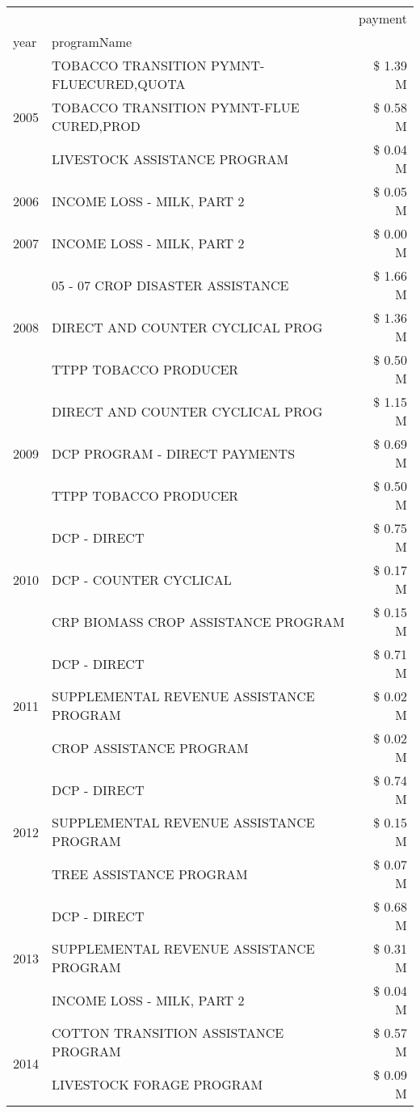 \begin{tabular}{llr}
\toprule
 &  & payment \\
year & programName &  \\
\midrule
\multirow[t]{3}{*}{2005} & TOBACCO TRANSITION PYMNT-FLUECURED,QUOTA & \$ 1.39 M \\
 & TOBACCO TRANSITION PYMNT-FLUE CURED,PROD & \$ 0.58 M \\
 & LIVESTOCK ASSISTANCE PROGRAM & \$ 0.04 M \\
\cline{1-3}
2006 & INCOME LOSS - MILK, PART 2 & \$ 0.05 M \\
\cline{1-3}
2007 & INCOME LOSS - MILK, PART 2 & \$ 0.00 M \\
\cline{1-3}
\multirow[t]{3}{*}{2008} & 05 - 07 CROP DISASTER ASSISTANCE & \$ 1.66 M \\
 & DIRECT AND COUNTER CYCLICAL PROG & \$ 1.36 M \\
 & TTPP TOBACCO PRODUCER & \$ 0.50 M \\
\cline{1-3}
\multirow[t]{3}{*}{2009} & DIRECT AND COUNTER CYCLICAL PROG & \$ 1.15 M \\
 & DCP PROGRAM - DIRECT PAYMENTS & \$ 0.69 M \\
 & TTPP TOBACCO PRODUCER & \$ 0.50 M \\
\cline{1-3}
\multirow[t]{3}{*}{2010} & DCP - DIRECT & \$ 0.75 M \\
 & DCP - COUNTER CYCLICAL & \$ 0.17 M \\
 & CRP BIOMASS CROP ASSISTANCE PROGRAM & \$ 0.15 M \\
\cline{1-3}
\multirow[t]{3}{*}{2011} & DCP - DIRECT & \$ 0.71 M \\
 & SUPPLEMENTAL REVENUE ASSISTANCE PROGRAM & \$ 0.02 M \\
 & CROP ASSISTANCE PROGRAM & \$ 0.02 M \\
\cline{1-3}
\multirow[t]{3}{*}{2012} & DCP - DIRECT & \$ 0.74 M \\
 & SUPPLEMENTAL REVENUE ASSISTANCE PROGRAM & \$ 0.15 M \\
 & TREE ASSISTANCE PROGRAM & \$ 0.07 M \\
\cline{1-3}
\multirow[t]{3}{*}{2013} & DCP - DIRECT & \$ 0.68 M \\
 & SUPPLEMENTAL REVENUE ASSISTANCE PROGRAM & \$ 0.31 M \\
 & INCOME LOSS - MILK, PART 2 & \$ 0.04 M \\
\cline{1-3}
\multirow[t]{3}{*}{2014} & COTTON TRANSITION ASSISTANCE PROGRAM & \$ 0.57 M \\
 & LIVESTOCK FORAGE PROGRAM & \$ 0.09 M \\

\end{tabular}
